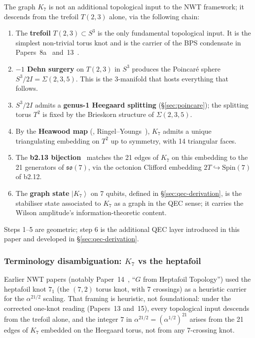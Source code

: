 \documentclass[11pt]{article}
\newcommand{\so}{\mathfrak{so}}
\newcommand{\Spin}{\mathrm{Spin}}
\newcommand{\ket}[1]{\left|#1\right\rangle}
\begin{document}
The graph $K_7$ is not an additional topological input to the
NWT framework; it descends from the trefoil $T(2,3)$ alone, via
the following chain:
\begin{enumerate}
\item The \textbf{trefoil} $T(2,3) \subset S^3$ is the only
  fundamental topological input.  It is the simplest non-trivial
  torus knot and is the carrier of the BPS condensate in
  Papers~8a~\cite{paper8a} and~13~\cite{paper13}.
\item \textbf{$-1$ Dehn surgery} on $T(2,3)$ in $S^3$ produces
  the Poincar\'e sphere $S^3/2I = \Sigma(2,3,5)$.  This is the
  3-manifold that hosts everything that follows.
\item $S^3/2I$ admits a \textbf{genus-1 Heegaard splitting}
  (\S\ref{sec:poincare}); the splitting torus $T^2$ is fixed by
  the Brieskorn structure of $\Sigma(2,3,5)$.
\item By the \textbf{Heawood map} (\cite{heawood1890},
  Ringel--Youngs~\cite{ringel-youngs}), $K_7$ admits a unique
  triangulating embedding on $T^2$ up to symmetry, with 14
  triangular faces.
\item The \textbf{b2.13 bijection}~\cite{paper16} matches the
  21 edges of $K_7$ on this embedding to the 21 generators of
  $\so(7)$, via the octonion Clifford embedding
  $2T \hookrightarrow \Spin(7)$ of b2.12.
\item The \textbf{graph state} $\ket{K_7}$ on 7 qubits, defined
  in \S\ref{sec:qec-derivation}, is the stabiliser state
  associated to $K_7$ as a graph in the QEC sense; it carries
  the Wilson amplitude's information-theoretic content.
\end{enumerate}
Steps 1--5 are geometric; step 6 is the additional QEC layer
introduced in this paper and developed in
\S\ref{sec:qec-derivation}.

\subsubsection*{Terminology disambiguation: $K_7$ vs the heptafoil}

Earlier NWT papers (notably Paper~14~\cite{paper14}, ``$G$ from
Heptafoil Topology'') used the heptafoil knot $7_1$ (the
$(7,2)$ torus knot, with 7 crossings) as a heuristic carrier for
the $\alpha^{21/2}$ scaling.  That framing is heuristic, not
foundational: under the corrected one-knot reading (Papers~13
and~15), every topological input descends from the trefoil
alone, and the integer $7$ in $\alpha^{21/2} = (\alpha^{1/2})^{21}$
arises from the 21 edges of $K_7$ embedded on the Heegaard torus,
not from any 7-crossing knot.
\end{document}
